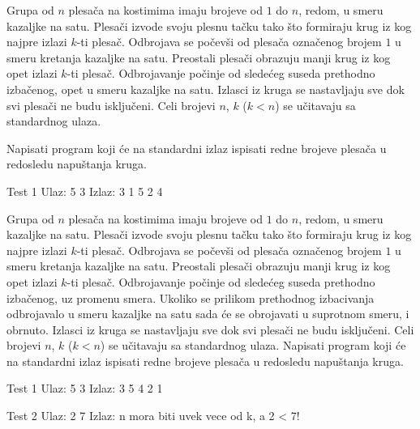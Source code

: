 \begin{Exercise}[label=612]
Grupa od $n$ plesača na kostimima imaju brojeve od $1$ do $n$, redom, u smeru kazaljke na satu.
Plesači izvode svoju plesnu tačku tako što formiraju krug iz kog najpre izlazi $k$-ti plesač.
Odbrojava se počevši od plesača označenog brojem $1$ u smeru kretanja kazaljke na satu. 
Preostali plesači obrazuju manji krug iz kog opet izlazi $k$-ti plesač. Odbrojavanje počinje od
sledećeg suseda prethodno izbačenog, opet u smeru kazaljke na satu. Izlasci iz kruga se nastavljaju
sve dok svi plesači ne budu isključeni. 
Celi brojevi $n$, $k$ ($k < n$) se učitavaju sa standardnog ulaza. 

Napisati program koji će na standardni izlaz ispisati redne brojeve plesača u redosledu napuštanja kruga. 
\begin{minitest}
\begin{test}{Test 1}
Ulaz: 
  5 3 
Izlaz: 
  3 1 5 2 4
\end{test}
\end{minitest}
\end{Exercise}
\begin{Answer}[ref=612]
\end{Answer}

\begin{Exercise}[label=613]
Grupa od $n$ plesača na kostimima imaju brojeve od $1$ do $n$, redom, u smeru kazaljke na satu.
Plesači izvode svoju plesnu tačku tako što formiraju krug iz kog najpre izlazi $k$-ti plesač.
Odbrojava se počevši od plesača označenog brojem $1$ u smeru kretanja kazaljke na satu. 
Preostali plesači obrazuju manji krug iz kog opet izlazi $k$-ti plesač. Odbrojavanje počinje od
sledećeg suseda prethodno izbačenog, uz promenu smera. Ukoliko se prilikom prethodnog izbacivanja odbrojavalo 
u smeru kazaljke na satu sada će se obrojavati u suprotnom smeru, i obrnuto. Izlasci iz kruga se nastavljaju
sve dok svi plesači ne budu isključeni. 
Celi brojevi $n$, $k$ ($k < n$) se učitavaju sa standardnog ulaza. 
Napisati program koji će na standardni izlaz ispisati redne brojeve plesača u redosledu napuštanja kruga. 
\begin{minitest}
\begin{test}{Test 1}
Ulaz: 
  5 3 
Izlaz: 
  3 5 4 2 1
\end{test}
\begin{test}{Test 2}
Ulaz: 
  2 7 
Izlaz: 
  n mora biti uvek vece od k, a 2 < 7!
\end{test}
\end{minitest}

\end{Exercise}
\begin{Answer}[ref=613]
\end{Answer}